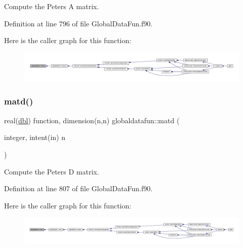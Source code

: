 Compute the Peters A matrix. 



Definition at line 796 of file Global\+Data\+Fun.\+f90.

Here is the caller graph for this function\+:\nopagebreak
\begin{figure}[H]
\begin{center}
\leavevmode
\includegraphics[width=350pt]{namespaceglobaldatafun_abc2a555e679f86fd986da760d49b71bc_icgraph}
\end{center}
\end{figure}
\mbox{\label{namespaceglobaldatafun_a5290afbf1d3da671a523a4727bdc7218}} 
\subsubsection{\texorpdfstring{matd()}{matd()}}
{\footnotesize\ttfamily real(\hyperlink{namespaceglobaldatafun_a5008801201dd34f2af8eae07756befb4}{dbl}) function, dimension(n,n) globaldatafun\+::matd (\begin{DoxyParamCaption}\item[{integer, intent(in)}]{n }\end{DoxyParamCaption})\hspace{0.3cm}{\ttfamily [private]}}



Compute the Peters D matrix. 



Definition at line 807 of file Global\+Data\+Fun.\+f90.

Here is the caller graph for this function\+:\nopagebreak
\begin{figure}[H]
\begin{center}
\leavevmode
\includegraphics[width=350pt]{namespaceglobaldatafun_a5290afbf1d3da671a523a4727bdc7218_icgraph}
\end{center}
\end{figure}
\mbox{\label{namespaceglobaldatafun_a562042b12250dbd7e3ef3a24d9f93a53}} 
